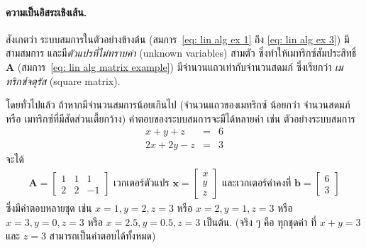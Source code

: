 \paragraph{ความเป็นอิสระเชิงเส้น.}
สังเกตว่า ระบบสมการในตัวอย่างข้างต้น (สมการ~\ref{eq: lin alg ex 1} ถึง \ref{eq: lin alg ex 3}) มีสามสมการ และมี\textit{ตัวแปรที่ไม่ทราบค่า} (unknown variables) สามตัว ซึ่งทำให้เมทริกซ์สัมประสิทธิ์ $\bm{A}$ (สมการ~\ref{eq: lin alg matrix example}) มีจำนวนแถวเท่ากับจำนวนสดมภ์ ซึ่งเรียกว่า \textit{เมทริกซ์จตุรัส} (square matrix).

โดยทั่วไปแล้ว
ถ้าหากมีจำนวนสมการน้อยเกินไป (จำนวนแถวของเมทริกซ์ น้อยกว่า จำนวนสดมภ์ หรือ เมทริกซ์ที่มีสัดส่วนเตี้ยกว้าง)
คำตอบของระบบสมการจะมีได้หลายค่า
เช่น ตัวอย่างระบบสมการ
\begin{eqnarray}
x + y + z &=& 6 
\nonumber \\
2 x + 2 y - z &=& 3
\nonumber
\end{eqnarray}
จะได้ 
\begin{eqnarray}
\bm{A} = 
\begin{bmatrix}
1 & 1 & 1 \\
2 & 2 & -1 
\end{bmatrix}
\mbox{ เวกเตอร์ตัวแปร }
%
\bm{x} = 
\begin{bmatrix}
x \\
y \\
z
\end{bmatrix}
\mbox{ และเวกเตอร์ค่าคงที่ }
\bm{b} =
\begin{bmatrix}
6 \\
3 
\end{bmatrix}
\nonumber
\end{eqnarray}
ซึ่งมีคำตอบหลายชุด 
เช่น $x = 1, y = 2, z = 3$
หรือ
$x = 2, y = 1, z = 3$
หรือ
$x = 3, y = 0, z = 3$
หรือ
$x = 2.5, y = 0.5, z = 3$ เป็นต้น.
(จริง ๆ คือ ทุกชุดค่า ที่ $x + y = 3$ และ $z = 3$ สามารถเป็นคำตอบได้ทั้งหมด)

